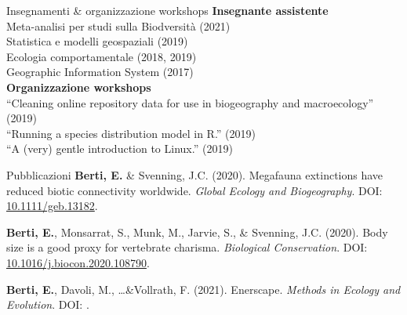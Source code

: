 \documentclass{resume} %
\begin{document}
\begin{rSection}{Insegnamenti \& organizzazione workshops}
{\bf Insegnante assistente} \\
Meta-analisi per studi sulla Biodversit\`{a} (2021)\\
Statistica e modelli geospaziali (2019)\\
Ecologia comportamentale (2018, 2019)\\
Geographic Information System (2017)\\
{\bf Organizzazione workshops}\\
``Cleaning online repository data for use in biogeography and macroecology'' (2019)\\
``Running a species distribution model in R.'' (2019)\\
``A (very) gentle introduction to Linux.'' (2019)
\end{rSection}




\begin{rSection}{Pubblicazioni}
\textbf{Berti, E.} \& Svenning, J.C. (2020). Megafauna extinctions have reduced biotic connectivity worldwide. \textit{Global Ecology and Biogeography}. DOI: \href{https://doi.org/10.1111/geb.13182}{10.1111/geb.13182}.

\textbf{Berti, E.}, Monsarrat, S., Munk, M., Jarvie, S., \& Svenning, J.C. (2020). Body size is a good proxy for vertebrate charisma. \textit{Biological Conservation}. DOI: \href{https://doi.org/10.1016/j.biocon.2020.108790}{10.1016/j.biocon.2020.108790}.

\textbf{Berti, E.}, Davoli, M., \dots \&Vollrath, F. (2021). Enerscape. \textit{Methods in Ecology and Evolution}. DOI: \href{}{}.
\end{rSection}
\end{document}

